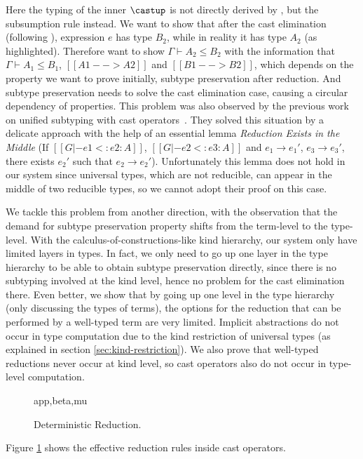 Here the typing of the inner $\castup$ is not directly derived by
, but the subsumption rule instead. We want to show that after
the cast elimination (following ), expression $e$ has type $B_2$,
while in reality it has type $A_2$ (as highlighted).
Therefore want to show $\Gamma \vdash A_2 \le B_2$ with the information that
$\Gamma \vdash A_1 \le B_1$, $[[A1 --> A2]]$
and $[[B1 --> B2]]$, which depends on the property we want to prove initially,
subtype preservation after reduction.
And subtype preservation needs to solve the cast elimination case, causing a
circular dependency of properties.
This problem was also observed by the previous work on unified subtyping
with cast operators~\cite{full}. They solved this situation
by a delicate approach with the help of an essential lemma
\emph{Reduction Exists in the Middle} (If $[[G |- e1 <: e2 : A]]$, $[[G |- e2 <: e3 : A]]$
and $e_1 \longrightarrow e_1'$, $e_3 \longrightarrow e_3'$, there exists $e_2'$
such that $e_2 \longrightarrow e_2'$). Unfortunately this lemma does not hold
in our system since universal types, which are not reducible, can appear in the
middle of two reducible types, so we cannot adopt their proof on this case.

We tackle this problem from another direction, with the observation that the
demand for subtype preservation property shifts from the term-level to the type-level.
With the calculus-of-constructions-like kind hierarchy, our system only have
limited layers in types.
In fact, we only need to go up one layer in the type hierarchy to be able to
obtain subtype preservation directly,
since there is no subtyping involved at the kind level,
hence no problem for the cast elimination there.
Even better, we show that by going up one level in the type hierarchy
(only discussing the types of terms), the options
for the reduction that can be performed by a well-typed term are very limited.
Implicit abstractions do not occur in type computation due to the kind
restriction of universal types (as explained in section \ref{sec:kind-restriction}).
We also prove that well-typed reductions never occur
at kind level, so cast operators also do not occur in type-level computation.

\begin{figure}
      {app,beta,mu}
    \caption{Deterministic Reduction.}
    \label{fig:deterministic-reduction}
\end{figure}

Figure \ref{fig:deterministic-reduction} shows the effective reduction rules
inside cast operators.

